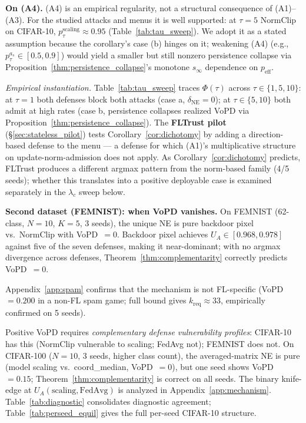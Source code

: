 \documentclass{article}
\newcommand{\UA}{U_A}
\begin{document}
\textbf{On (A4).} (A4) is an empirical regularity, not a structural consequence of (A1)--(A3). For the studied attacks and menus it is well supported: at $\tau{=}5$ NormClip on CIFAR-10, $p^{\mathrm{scaling}}_{\tau} \approx 0.95$ (Table~\ref{tab:tau_sweep}). We adopt it as a stated assumption because the corollary's case (b) hinges on it; weakening (A4) (e.g., $p^{a_s}_\tau \in [0.5, 0.9]$) would yield a smaller but still nonzero persistence collapse via Proposition~\ref{thm:persistence_collapse}'s monotone $s_\infty$ dependence on $p_{\mathrm{eff}}$.

\emph{Empirical instantiation.} Table~\ref{tab:tau_sweep} traces $\Phi(\tau)$ across $\tau \in \{1, 5, 10\}$: at $\tau{=}1$ both defenses block both attacks (case a, $\delta_{\mathrm{NE}}=0$); at $\tau{\in}\{5,10\}$ both admit at high rates (case b, persistence collapses realized VoPD via Proposition~\ref{thm:persistence_collapse}). The \textbf{FLTrust pilot} (§\ref{sec:stateless_pilot}) tests Corollary~\ref{cor:dichotomy} by adding a direction-based defense to the menu --- a defense for which (A1)'s multiplicative structure on update-norm-admission does not apply. As Corollary~\ref{cor:dichotomy} predicts, FLTrust produces a different argmax pattern from the norm-based family (4/5 seeds); whether this translates into a positive deployable case is examined separately in the $\lambda_c$ sweep below.

\textbf{Second dataset (FEMNIST): when VoPD vanishes.} On FEMNIST (62-class, $N=10$, $K=5$, 3 seeds), the unique NE is pure backdoor pixel vs.\ NormClip with VoPD~$= 0$. Backdoor pixel achieves $U_A \in [0.968, 0.978]$ against five of the seven defenses, making it near-dominant; with no argmax divergence across defenses, Theorem~\ref{thm:complementarity} correctly predicts VoPD~$= 0$.

Appendix~\ref{app:spam} confirms that the mechanism is not FL-specific (VoPD~$= 0.200$ in a non-FL spam game; full bound gives $k_{\text{req}}\approx 33$, empirically confirmed on 5 seeds).

Positive VoPD requires \emph{complementary defense vulnerability profiles}: CIFAR-10 has this (NormClip vulnerable to scaling; FedAvg not); FEMNIST does not. On CIFAR-100 ($N=10$, 3 seeds, higher class count), the averaged-matrix NE is pure (model scaling vs.\ coord\_median, VoPD~$= 0$), but one seed shows VoPD~$= 0.15$; Theorem~\ref{thm:complementarity} is correct on all seeds. The binary knife-edge at $\UA(\text{scaling}, \text{FedAvg})$ is analyzed in Appendix~\ref{app:mechanism}. Table~\ref{tab:diagnostic} consolidates diagnostic agreement; Table~\ref{tab:perseed_equil} gives the full per-seed CIFAR-10 structure.
\end{document}
